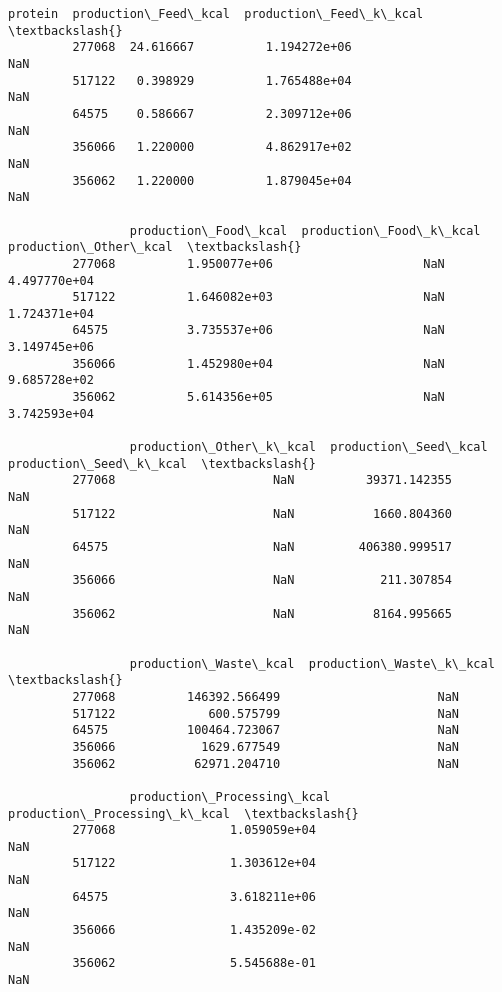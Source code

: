 \documentclass[11pt]{article}
\begin{document}
\begin{Verbatim}[commandchars=\\\{\}]
                   protein  production\_Feed\_kcal  production\_Feed\_k\_kcal  \textbackslash{}
         277068  24.616667          1.194272e+06                     NaN   
         517122   0.398929          1.765488e+04                     NaN   
         64575    0.586667          2.309712e+06                     NaN   
         356066   1.220000          4.862917e+02                     NaN   
         356062   1.220000          1.879045e+04                     NaN   
         
                 production\_Food\_kcal  production\_Food\_k\_kcal  production\_Other\_kcal  \textbackslash{}
         277068          1.950077e+06                     NaN           4.497770e+04   
         517122          1.646082e+03                     NaN           1.724371e+04   
         64575           3.735537e+06                     NaN           3.149745e+06   
         356066          1.452980e+04                     NaN           9.685728e+02   
         356062          5.614356e+05                     NaN           3.742593e+04   
         
                 production\_Other\_k\_kcal  production\_Seed\_kcal  production\_Seed\_k\_kcal  \textbackslash{}
         277068                      NaN          39371.142355                     NaN   
         517122                      NaN           1660.804360                     NaN   
         64575                       NaN         406380.999517                     NaN   
         356066                      NaN            211.307854                     NaN   
         356062                      NaN           8164.995665                     NaN   
         
                 production\_Waste\_kcal  production\_Waste\_k\_kcal  \textbackslash{}
         277068          146392.566499                      NaN   
         517122             600.575799                      NaN   
         64575           100464.723067                      NaN   
         356066            1629.677549                      NaN   
         356062           62971.204710                      NaN   
         
                 production\_Processing\_kcal  production\_Processing\_k\_kcal  \textbackslash{}
         277068                1.059059e+04                           NaN   
         517122                1.303612e+04                           NaN   
         64575                 3.618211e+06                           NaN   
         356066                1.435209e-02                           NaN   
         356062                5.545688e-01                           NaN   
         

\end{Verbatim}
\end{document}
